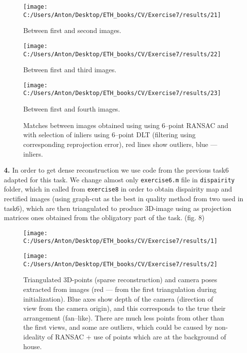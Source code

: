 \documentclass{report}
\begin{document}
	\begin{figure}[h]
		\begin{center}
	\begin{minipage}[h]{0.9\linewidth}
		\texttt{[image: C:/Users/Anton/Desktop/ETH\_books/CV/Exercise7/results/21]}
		\caption{Between first and second images.}
	\end{minipage}
	\vfill
	\begin{minipage}[h]{0.9\linewidth}
		\texttt{[image: C:/Users/Anton/Desktop/ETH\_books/CV/Exercise7/results/22]}
		\caption{Between first and third images.}
	\end{minipage}
	\vfill
	\begin{minipage}[h]{0.9\linewidth}
		\texttt{[image: C:/Users/Anton/Desktop/ETH\_books/CV/Exercise7/results/23]}
		\caption{Between first and fourth images.}
	\end{minipage}
		\end{center}
	\caption{Matches between images obtained using using 6--point RANSAC and with selection of inliers using 6--point DLT (filtering using corresponding reprojection error), red lines show outliers, blue --- inliers.}
	\end{figure}


\textbf{4.} 
In order to get dense reconstruction we use code from the previous task6 adapted for this task. We change almost only \texttt{exercise6.m} file in \texttt{dispairity} folder, which in called from \texttt{exercise8} in order to obtain dispairity map and rectified images (using graph-cut as the best in quality method from two used in task6), which are then triangulated to produce 3D-image using as projection matrices ones obtained from the obligatory part of the task. (fig. 8)
	\begin{figure}[h]
	\begin{center}
		\begin{minipage}[h]{0.45\linewidth}
			\texttt{[image: C:/Users/Anton/Desktop/ETH\_books/CV/Exercise7/results/1]}
		\end{minipage}
		\hfill
		\begin{minipage}[h]{0.45\linewidth}
			\texttt{[image: C:/Users/Anton/Desktop/ETH\_books/CV/Exercise7/results/2]}
		\end{minipage}
		\caption{Triangulated 3D-points (sparse reconstruction)  and camera poses extracted from images (red --- from the first triangulation during initialization). Blue axes show depth of the camera (direction of view from the camera origin), and this corresponds to the true their arrangement (fan--like). There are much less points from other than the first views, and some are outliers, which could be caused by non-ideality of RANSAC + use of points which are at the background of house.}
	\end{center}
\end{figure}
\end{document}
